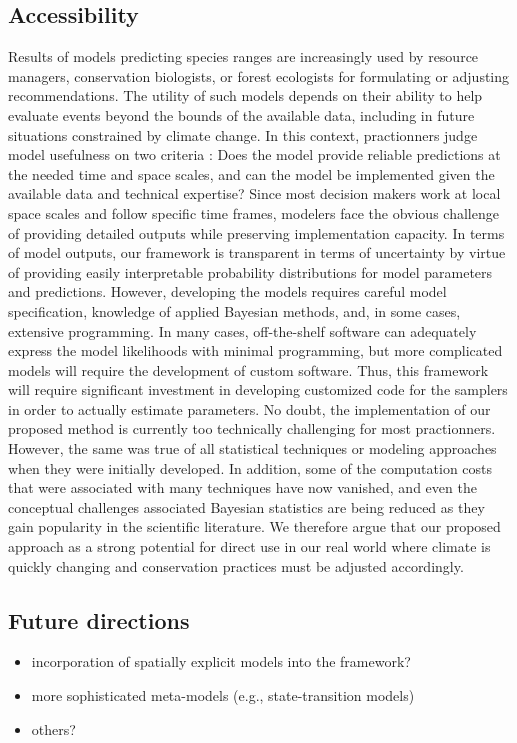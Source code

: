 \subsection*{Accessibility}
Results of models predicting species ranges are increasingly used by resource managers, conservation biologists, or forest ecologists for formulating or adjusting recommendations. 
The utility of such models depends on their ability to help evaluate events beyond the bounds of the available data, including in future situations constrained by climate change. 
In this context, practionners judge model usefulness on two criteria : Does the model provide reliable predictions at the needed time and space scales, and can the model be implemented given the available data and technical expertise? 
Since most decision makers work at local space scales and follow specific time frames, modelers face the obvious challenge of providing detailed outputs while preserving implementation capacity.
In terms of model outputs, our framework is transparent in terms of uncertainty by virtue of providing easily interpretable probability distributions for model parameters and predictions.
However, developing the models requires careful model specification, knowledge of applied Bayesian methods, and, in some cases, extensive programming.
In many cases, off-the-shelf software \citep[e.g.,][]{R, RJAGS} can adequately express the model likelihoods with minimal programming, but more complicated models will require the development of custom software.
Thus, this framework will require significant investment in developing customized code for the samplers in order to actually estimate parameters.
No doubt, the implementation of our proposed method is currently too technically challenging for most practionners. 
However, the same was true of all statistical techniques or modeling approaches when they were initially developed. 
In addition, some of the computation costs that were associated with many techniques have now vanished, and even the conceptual challenges associated Bayesian statistics are being reduced as they gain popularity in the scientific literature. 
We therefore argue that our proposed approach as a strong potential for direct use in our real world where climate is quickly changing and conservation practices must be adjusted accordingly.

\subsection*{Future directions}
\begin{itemize}
	\item incorporation of spatially explicit models into the framework? \citep[e.g.,][]{Fortin2012}
	\item more sophisticated meta-models (e.g., state-transition models)
	\item others?
\end{itemize}
